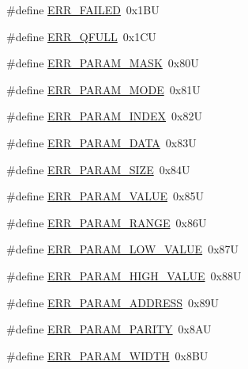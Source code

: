 \begin{DoxyCompactItemize}
\#define \hyperlink{group___p_e___error__module_gada2a13c14425d327be8414733c7e4a56}{E\-R\-R\-\_\-\-F\-A\-I\-L\-E\-D}~0x1\-B\-U
\item 
\#define \hyperlink{group___p_e___error__module_gad65300b536c4165d469701d5db712cd0}{E\-R\-R\-\_\-\-Q\-F\-U\-L\-L}~0x1\-C\-U
\item 
\#define \hyperlink{group___p_e___error__module_ga970a8c8e887512534203a47758618763}{E\-R\-R\-\_\-\-P\-A\-R\-A\-M\-\_\-\-M\-A\-S\-K}~0x80\-U
\item 
\#define \hyperlink{group___p_e___error__module_ga82c14ce7730e53556eebd8522e60f7a9}{E\-R\-R\-\_\-\-P\-A\-R\-A\-M\-\_\-\-M\-O\-D\-E}~0x81\-U
\item 
\#define \hyperlink{group___p_e___error__module_ga62fe765f9a9f81fab7fda1c66f798460}{E\-R\-R\-\_\-\-P\-A\-R\-A\-M\-\_\-\-I\-N\-D\-E\-X}~0x82\-U
\item 
\#define \hyperlink{group___p_e___error__module_gaeb2f60cce36e220acadb18ae558d7fe6}{E\-R\-R\-\_\-\-P\-A\-R\-A\-M\-\_\-\-D\-A\-T\-A}~0x83\-U
\item 
\#define \hyperlink{group___p_e___error__module_ga28178b0019131081a20e071b469f8154}{E\-R\-R\-\_\-\-P\-A\-R\-A\-M\-\_\-\-S\-I\-Z\-E}~0x84\-U
\item 
\#define \hyperlink{group___p_e___error__module_gab1b9c8e3380ec0d179ca12c15376e87a}{E\-R\-R\-\_\-\-P\-A\-R\-A\-M\-\_\-\-V\-A\-L\-U\-E}~0x85\-U
\item 
\#define \hyperlink{group___p_e___error__module_ga41549ae34f9b04ae4999ea6d409e37cd}{E\-R\-R\-\_\-\-P\-A\-R\-A\-M\-\_\-\-R\-A\-N\-G\-E}~0x86\-U
\item 
\#define \hyperlink{group___p_e___error__module_gabc89752a87a9f53f321fbab8d09a8ede}{E\-R\-R\-\_\-\-P\-A\-R\-A\-M\-\_\-\-L\-O\-W\-\_\-\-V\-A\-L\-U\-E}~0x87\-U
\item 
\#define \hyperlink{group___p_e___error__module_ga9229f7ed87a3c19d767a531f64878de4}{E\-R\-R\-\_\-\-P\-A\-R\-A\-M\-\_\-\-H\-I\-G\-H\-\_\-\-V\-A\-L\-U\-E}~0x88\-U
\item 
\#define \hyperlink{group___p_e___error__module_ga74cd838ca304eac3802e330625e40eaf}{E\-R\-R\-\_\-\-P\-A\-R\-A\-M\-\_\-\-A\-D\-D\-R\-E\-S\-S}~0x89\-U
\item 
\#define \hyperlink{group___p_e___error__module_ga00e4ff0963dd709271c3ec8a56bf5611}{E\-R\-R\-\_\-\-P\-A\-R\-A\-M\-\_\-\-P\-A\-R\-I\-T\-Y}~0x8\-A\-U
\item 
\#define \hyperlink{group___p_e___error__module_ga11fd34b18ad64242e823cd535b660d66}{E\-R\-R\-\_\-\-P\-A\-R\-A\-M\-\_\-\-W\-I\-D\-T\-H}~0x8\-B\-U

\end{DoxyCompactItemize}
